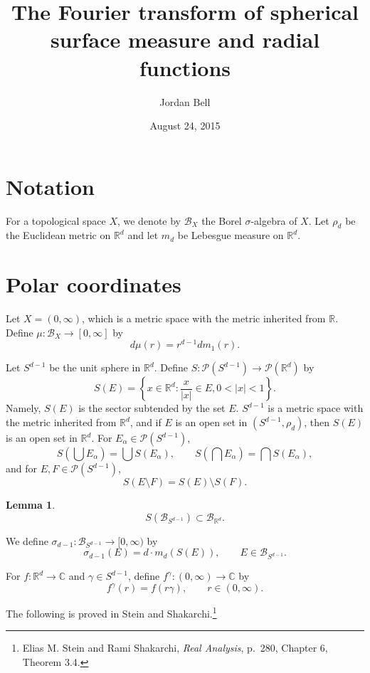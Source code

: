 \documentclass{article}
\newtheorem{lemma}[theorem]{Lemma}
\begin{document}
\title{The Fourier transform of spherical surface  measure and radial functions}
\author{Jordan Bell}
\date{August 24, 2015}

\maketitle

\section{Notation}
For a topological space $X$, we denote by $\mathscr{B}_X$ the Borel $\sigma$-algebra of $X$.
Let $\rho_d$ be the Euclidean metric on $\mathbb{R}^d$ and let $m_d$ be Lebesgue measure on $\mathbb{R}^d$. 


\section{Polar coordinates}
Let $X=(0,\infty)$, which is a metric space with the metric inherited from $\mathbb{R}$.
Define $\mu:\mathscr{B}_X \to [0,\infty]$ by
\[
d\mu(r)=r^{d-1} dm_1(r).
\]

Let $S^{d-1}$ be the unit sphere in $\mathbb{R}^d$.
Define $S:\mathscr{P}(S^{d-1}) \to \mathscr{P}(\mathbb{R}^d)$ by
\[
S(E) = \left\{x \in \mathbb{R}^d: \frac{x}{|x|} \in E, 0 < |x| < 1 \right\}.
\]
Namely, $S(E)$ is the sector subtended by the set $E$.
$S^{d-1}$ is a metric space with the metric inherited from $\mathbb{R}^d$, and 
if $E$ is an open set in $(S^{d-1},\rho_d)$, then $S(E)$ is an open set in $\mathbb{R}^d$. 
For $E_\alpha \in \mathscr{P}(S^{d-1})$,
\[
S\left( \bigcup E_\alpha \right) = \bigcup S(E_\alpha),
\qquad S\left( \bigcap E_\alpha \right) = \bigcap S(E_\alpha),
\]
and for $E,F \in \mathscr{P}(S^{d-1})$,
\[
S(E \setminus F) = S(E) \setminus S(F).
\]

\begin{lemma}
\[
S ( \mathscr{B}_{S^{d-1}}) \subset \mathscr{B}_{\mathbb{R}^d}.
\]
\end{lemma}

We define $\sigma_{d-1}:\mathscr{B}_{S^{d-1}} \to [0,\infty)$ by
\[
\sigma_{d-1}(E) = d \cdot m_d(S(E)),
\qquad E \in \mathscr{B}_{S^{d-1}}.
\]

For $f:\mathbb{R}^d \to \mathbb{C}$ and $\gamma \in S^{d-1}$, define $f^\gamma:(0,\infty) \to \mathbb{C}$ by
\[
f^\gamma(r) = f(r\gamma), \qquad r \in (0,\infty).
\]


The following is proved in Stein and Shakarchi.\footnote{Elias M. Stein and Rami Shakarchi, {\em Real Analysis}, 
p.~280, Chapter 6, Theorem 3.4.}
\end{document}
